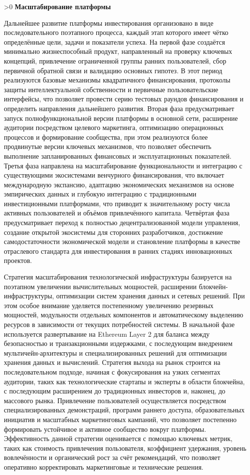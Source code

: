 \documentclass[
    14pt,
    specialist,
    candidate, %
    subf, %
    href,
    dotsinheaders=false
]{disser}
\newcommand{\mysection}[1]{%
  \ifnum\value{section}>0
  \vspace{1em}
  \fi
  \refstepcounter{section}
  \hypertarget{sec:\thechapter.\thesection}{}%
  \textbf{\thesection\space #1}
  \addcontentsline{toc}{section}{\texorpdfstring{\thesection\hspace{2em}#1}{Section \thesection}}%
}
\renewcommand{\thechapter}{\arabic{chapter}}
\begin{document}
\mysection{Масштабирование платформы}

Дальнейшее развитие платформы инвестирования организовано в виде последовательного поэтапного процесса, каждый этап которого имеет чётко определённые цели, задачи и показатели успеха. На первой фазе создаётся минимально жизнеспособный продукт, направленный на проверку ключевых концепций, привлечение ограниченной группы ранних пользователей, сбор первичной обратной связи и валидацию основных гипотез. В этот период реализуются базовые механизмы квадратичного финансирования, протоколы защиты интеллектуальной собственности и первичные пользовательские интерфейсы, что позволяет провести серию тестовых раундов финансирования и определить направления дальнейшего развития. Вторая фаза предусматривает запуск полнофункциональной версии платформы в основной сети, расширение аудитории посредством целевого маркетинга, оптимизацию операционных процессов и формирование сообщества, при этом реализуются более продвинутые версии ключевых механизмов, что позволяет обеспечить выполнение запланированных финансовых и эксплуатационных показателей. Третья фаза направлена на масштабирование функциональности и интеграцию с существующими экосистемами венчурного финансирования, что включает международную экспансию, адаптацию экономических механизмов на основе эмпирических данных и глубокую интеграцию с традиционными инвестиционными платформами, что приводит к значительному росту числа активных пользователей и объёмов привлечённого капитала. Четвёртая фаза предусматривает переход к полностью децентрализованной модели управления, создание открытой экосистемы для сторонних разработчиков, достижение самодостаточности экономической модели и становление платформы в качестве отраслевого стандарта для инвестирования в ранних стадиях инновационных проектов.

Стратегия масштабирования технологической инфраструктуры базируется на поэтапном увеличении вычислительных мощностей, расширении блокчейн-инфраструктуры, оптимизации систем хранения данных и сетевых решений. При этом особое внимание уделяется постепенному увеличению резервных мощностей, модульности отдельных компонентов и автоматическому выделению ресурсов в зависимости от текущих потребностей системы. В начальной фазе используется развертывание на Ethereum Layer 2 для баланса между безопасностью и транзакционными издержками, с последующим внедрением мультичейн-архитектуры и специализированных решений для оптимизации хранения данных и вычислений. Стратегия выхода на рынок строится на последовательном подходе, начиная с фокусирования на узких сегментах аудитории, таких как технологические стартапы и эксперты в области блокчейна, с последующим расширением до традиционных инвесторов и, наконец, до массового рынка. Привлечение пользователей осуществляется посредством специализированных демонстраций, программ раннего доступа, образовательных инициатив и масштабных маркетинговых кампаний, что позволяет постепенно формировать устойчивое и активное сообщество вокруг платформы. Эффективность данной стратегии оценивается с помощью ключевых метрик, таких как стоимость привлечения пользователя, коэффициент удержания, уровень вовлечённости и органический рост за счёт рекомендаций, что позволяет оперативно корректировать маркетинговые и технические решения.
\end{document}
